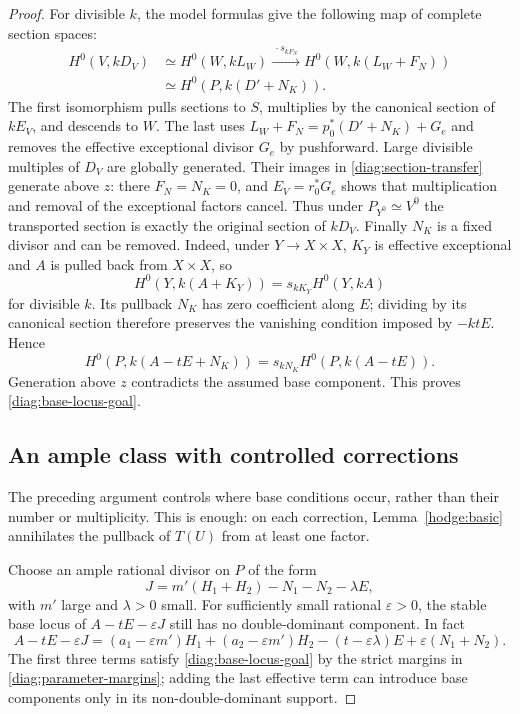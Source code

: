 \begin{proof}
For divisible $k$, the model formulas give the following map of complete
section spaces:
\begin{equation}\label{diag:section-transfer}
 \begin{aligned}
 H^0(V,kD_V)&\simeq H^0(W,kL_W)
   \xrightarrow{\ \cdot s_{kF_N}\ }H^0(W,k(L_W+F_N))\\
   &\simeq H^0(P,k(D'+N_K)).
 \end{aligned}
\end{equation}
The first isomorphism pulls sections to $S$, multiplies by the canonical
section of $kE_V$, and descends to $W$.  The last uses
$L_W+F_N=p_0^*(D'+N_K)+G_e$ and removes the effective exceptional
divisor $G_e$ by pushforward.  Large divisible multiples of $D_V$ are
globally generated.  Their images in \eqref{diag:section-transfer}
generate above $z$: there $F_N=N_K=0$, and
$E_V=r_0^*G_e$ shows that multiplication and removal of the exceptional
factors cancel.  Thus under $P_{Y^0}\simeq V^0$ the transported section
is exactly the original section of $kD_V$.
Finally $N_K$ is a fixed divisor and can be removed.  Indeed, under
$Y\to X\times X$, $K_Y$ is effective exceptional and $A$ is pulled
back from $X\times X$, so
\[
 H^0(Y,k(A+K_Y))=s_{kK_Y}H^0(Y,kA)
\]
for divisible $k$.  Its pullback $N_K$ has zero coefficient along $E$;
dividing by its canonical section therefore preserves the vanishing
condition imposed by $-ktE$.  Hence
\[
 H^0(P,k(A-tE+N_K))=s_{kN_K}H^0(P,k(A-tE)).
\]
Generation above $z$ contradicts the assumed base component.  This
proves \eqref{diag:base-locus-goal}.

\subsection*{An ample class with controlled corrections}

The preceding argument controls where base conditions occur, rather
than their number or multiplicity.  This is enough: on each correction,
Lemma~\ref{hodge:basic} annihilates the pullback of $T(U)$ from at least
one factor.

Choose an ample rational divisor on $P$ of the form
\[
 J=m'(H_1+H_2)-N_1-N_2-\lambda E,
\]
with $m'$ large and $\lambda>0$ small.  For sufficiently small rational
$\varepsilon>0$, the stable base locus of $A-tE-\varepsilon J$ still
has no double-dominant component.  In fact
\[
 A-tE-\varepsilon J
 =(a_1-\varepsilon m')H_1+(a_2-\varepsilon m')H_2
   -(t-\varepsilon\lambda)E+\varepsilon(N_1+N_2).
\]
The first three terms satisfy \eqref{diag:base-locus-goal} by the strict
margins in \eqref{diag:parameter-margins}; adding the last effective
term can introduce base components only in its non-double-dominant
support.


\end{proof}
